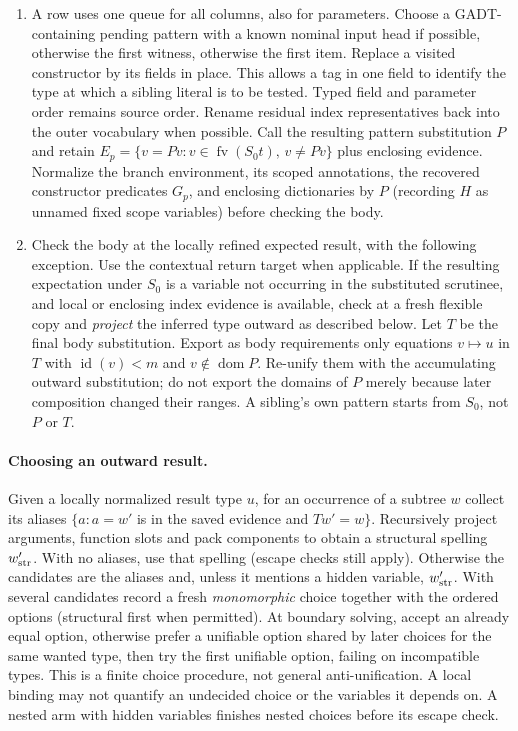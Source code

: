 \documentclass[11pt]{article}
\theoremstyle{definition}
\newcommand{\fv}{\operatorname{fv}}
\newcommand{\dom}{\operatorname{dom}}
\begin{document}
\begin{enumerate}
the typed constructor pattern. Children may use permitted row evidence,
including such witnesses from enclosing constructors.
\item A row uses one queue for all columns, also for parameters. Choose a
GADT-containing pending pattern with a known nominal input head if possible,
otherwise the first witness, otherwise the first item. Replace a visited
constructor by its fields in place. This allows a tag in one field to identify
the type at which a sibling literal is to be tested. Typed field and parameter
order remains source order. Rename residual index representatives back into
the outer vocabulary when possible. Call the resulting pattern substitution
$P$ and retain $E_p=\{v=Pv : v\in\fv(S_0t),\,v\ne Pv\}$ plus enclosing
evidence. Normalize the branch environment, its scoped annotations, the
recovered constructor predicates $G_p$, and enclosing dictionaries by $P$
(recording $H$ as unnamed fixed scope variables) before checking the body.
\item Check the body at the locally refined expected result, with the
following exception. Use the contextual return target when applicable.
If the resulting expectation under $S_0$ is a variable not occurring in
the substituted scrutinee, and local or enclosing index evidence is
available, check at a fresh flexible copy and \emph{project} the inferred
type outward as described below.
Let $T$ be the final body substitution. Export as body requirements only
equations $v\mapsto u$ in $T$ with $\operatorname{id}(v)<m$ and
$v\notin\dom P$. Re-unify them with the accumulating outward substitution;
do not export the domains of $P$ merely because later composition changed
their ranges. A sibling's own pattern starts from $S_0$, not $P$ or $T$.
\end{enumerate}

\paragraph{Choosing an outward result.}
Given a locally normalized result type $u$, for an occurrence of a subtree
$w$ collect its aliases $\{a:a=w'$ is in the saved evidence and
$Tw'=w\}$. Recursively project arguments, function slots and pack components
to obtain a structural spelling $w'_{\rm str}$. With no aliases, use that
spelling (escape checks still apply). Otherwise the candidates are the
aliases and, unless it mentions a hidden variable, $w'_{\rm str}$. With
several candidates record a fresh \emph{monomorphic} choice together with
the ordered options (structural first when permitted). At boundary solving,
accept an already equal option, otherwise prefer a unifiable option shared
by later choices for the same wanted type, then try the first unifiable
option, failing on incompatible types. This is a finite choice procedure,
not general anti-unification. A local binding may not quantify an undecided
choice or the variables it depends on. A nested arm with hidden variables
finishes nested choices before its escape check.
\end{document}
